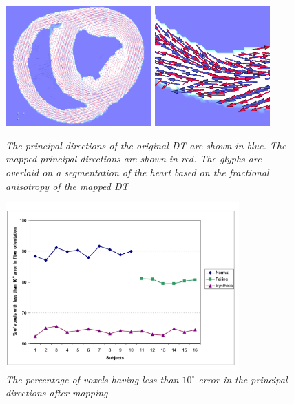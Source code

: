 \begin{figure}
\begin{center}
\includegraphics[width=0.5\textwidth]{images/pd_mapped_dti_2} 
\includegraphics[width=0.395\textwidth]{images/pd_mapped_dti_3} 
\caption{\em \small The principal directions of the original DT are shown in blue. The mapped principal directions are shown in red. The glyphs are overlaid on a segmentation of the heart based on the fractional anisotropy of the mapped DT}
\label{fig:pd_both}
\end{center}  
\end{figure} 

\begin{figure}
\begin{center}
\includegraphics[width=0.8\textwidth]{images/graph} 
\caption{\em \small The percentage of voxels having less than $10^\circ$ error in the principal directions after mapping }
\label{fig:graph}
\end{center}  
\end{figure} 

